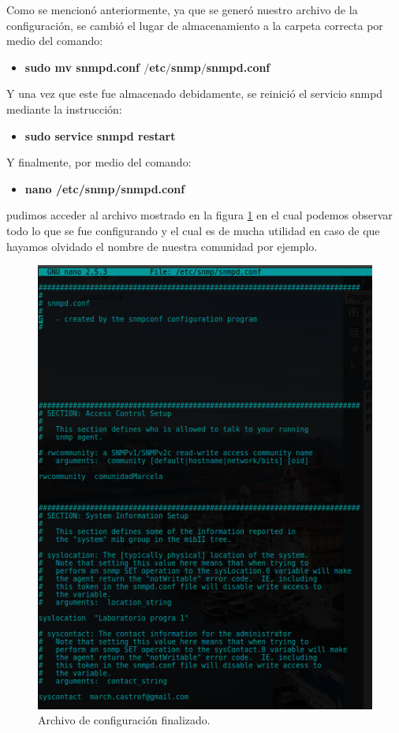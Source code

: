 Como se mencionó anteriormente, ya que se generó nuestro archivo de la configuración, se cambió el lugar de almacenamiento a la carpeta correcta por medio del comando:
\begin{itemize}
\item \textbf{sudo mv snmpd.conf $/$etc$/$snmp$/$snmpd.conf}
\end{itemize}
Y una vez que este fue almacenado debidamente, se reinició el servicio snmpd mediante la instrucción:
\begin{itemize}
\item \textbf{sudo service snmpd restart}
\end{itemize}
Y finalmente, por medio del comando:
\begin{itemize}
\item \textbf{nano /etc/snmp/snmpd.conf}
\end{itemize}
pudimos acceder al archivo mostrado en la figura \ref{image:snmp} en el cual podemos observar todo lo que se fue configurando y el cual es de mucha utilidad en caso de que hayamos olvidado el nombre de nuestra comunidad por ejemplo.
\FloatBarrier
\begin{figure}[htbp!]
		\centering
			\includegraphics[width=.9 \textwidth]{images/snmpconf}
		\caption{Archivo de configuración finalizado.}
		\label{image:snmp}
\end{figure}
\FloatBarrier

